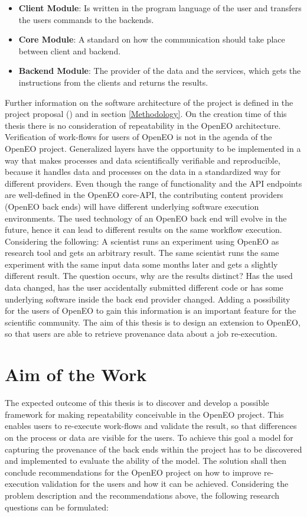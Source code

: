 \documentclass[draft,final]{vutinfth} %
\begin{document}
\begin{itemize}
	\item \textbf{Client Module}: Is written in the program language of the user and transfers the users commands to the backends.
	\item \textbf{Core Module}: A standard on how the communication should take place between client and backend.
	\item \textbf{Backend Module}: The provider of the data and the services, which gets the instructions from the clients and returns the results.
\end{itemize}   
Further information on the software architecture of the project is defined in the project proposal (\cite{openeo}) and in section \ref{Methodology}. On the creation time of this thesis there is no consideration of repeatability in the OpenEO architecture. Verification of work-flows for users of OpenEO is not in the agenda of the OpenEO project. Generalized layers have the opportunity to be implemented in a way that makes processes and data scientifically verifiable and reproducible, because it handles data and processes on the data in a standardized way for different providers. Even though the range of functionality and the API endpoints are well-defined in the OpenEO core-API, the contributing content providers (OpenEO back ends) will have different underlying software execution environments. The used technology of an OpenEO back end will evolve in the future, hence it can lead to different results on the same workflow execution. Considering the following: A scientist runs an experiment using OpenEO as research tool and gets an arbitrary result. The same scientist runs the same experiment with the same input data some months later and gets a slightly different result. The question occurs, why are the results distinct? Has the used data changed, has the user accidentally submitted different code or has some underlying software inside the back end provider changed. Adding a possibility for the users of OpenEO to gain this information is an important feature for the scientific community. The aim of this thesis is to design an extension to OpenEO, so that users are able to retrieve provenance data about a job re-execution. \cite{openeo}

\section{Aim of the Work}\label{Aim}

The expected outcome of this thesis is to discover and develop a possible framework for making repeatability conceivable in the OpenEO project. This enables users to re-execute work-flows and validate the result, so that differences on the process or data are visible for the users. To achieve this goal a model for capturing the provenance of the back ends within the project has to be discovered and implemented to evaluate the ability of the model. The solution shall then conclude recommendations for the OpenEO project on how to improve re-execution validation for the users and how it can be achieved. Considering the problem description and the recommendations above, the following research questions can be formulated:
\end{document}

